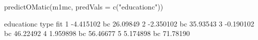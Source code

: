 \begin{Schunk}
\begin{Sinput}
 predictOMatic(m1mc, predVals = c("educationc"))
\end{Sinput}
\begin{Soutput}
  educationc type      fit
1  -4.415102   bc 26.09849
2  -2.350102   bc 35.93543
3  -0.190102   bc 46.22492
4   1.959898   bc 56.46677
5   5.174898   bc 71.78190
\end{Soutput}
\end{Schunk}
